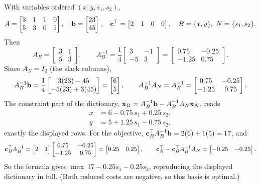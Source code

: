 With variables ordered $(x, y, s_1, s_2)$,
\[
A = \begin{bmatrix} 3 & 1 & 1 & 0 \\ 5 & 3 & 0 & 1 \end{bmatrix},
\quad
\mathbf{b} = \begin{bmatrix} 23 \\ 45 \end{bmatrix},
\quad
\mathbf{c}^\top = \begin{bmatrix} 2 & 1 & 0 & 0 \end{bmatrix},
\quad
B = \{x, y\},\ N = \{s_1, s_2\}.
\]
Then
\[
A_B = \begin{bmatrix} 3 & 1 \\ 5 & 3 \end{bmatrix},
\qquad
A_B^{-1} = \frac{1}{4} \begin{bmatrix} 3 & -1 \\ -5 & 3 \end{bmatrix}
= \begin{bmatrix} 0.75 & -0.25 \\ -1.25 & 0.75 \end{bmatrix}.
\]
Since $A_N = I_2$ (the slack columns),
\[
A_B^{-1}\mathbf{b} = \frac14 \begin{bmatrix} 3(23) - 45 \\ -5(23) + 3(45) \end{bmatrix}
= \begin{bmatrix} 6 \\ 5 \end{bmatrix},
\qquad
A_B^{-1}A_N = A_B^{-1}
= \begin{bmatrix} 0.75 & -0.25 \\ -1.25 & 0.75 \end{bmatrix}.
\]
The constraint part of the dictionary,
$\mathbf{x}_B = A_B^{-1}\mathbf{b} - A_B^{-1}A_N \mathbf{x}_N$, reads
\[
\begin{aligned}
x &= 6 - 0.75\,s_1 + 0.25\,s_2, \\
y &= 5 + 1.25\,s_1 - 0.75\,s_2,
\end{aligned}
\]
exactly the displayed rows. For the objective,
$\mathbf{c}_B^\top A_B^{-1}\mathbf{b} = 2(6) + 1(5) = 17$, and
\[
\mathbf{c}_B^\top A_B^{-1} = \begin{bmatrix} 2 & 1 \end{bmatrix}
\begin{bmatrix} 0.75 & -0.25 \\ -1.25 & 0.75 \end{bmatrix}
= \begin{bmatrix} 0.25 & 0.25 \end{bmatrix},
\qquad
\mathbf{c}_N^\top - \mathbf{c}_B^\top A_B^{-1}A_N
= \begin{bmatrix} -0.25 & -0.25 \end{bmatrix}.
\]
So the formula gives
$\max\ 17 - 0.25 s_1 - 0.25 s_2$, reproducing the displayed dictionary
in full. (Both reduced costs are negative, so this basis is optimal.)

